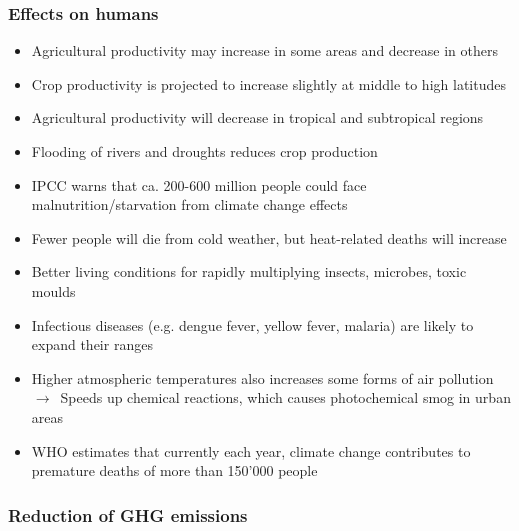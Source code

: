 \documentclass{article}
\begin{document}
\subsubsection{Effects on humans}
\vspace*{-.4cm}
\begin{itemize}
    \item Agricultural productivity may increase in some areas and decrease in others
    \item Crop productivity is projected to increase slightly at middle to high latitudes
    \item Agricultural productivity will decrease in tropical and subtropical regions
    \item Flooding of rivers and droughts reduces crop production
    \item IPCC warns that ca. 200-600 million people could face malnutrition/starvation from climate change effects
\end{itemize}

\vspace*{-.4cm}
\begin{itemize}
    \item Fewer people will die from cold weather, but heat-related deaths will increase
    \item Better living conditions for rapidly multiplying insects, microbes, toxic moulds
    \item Infectious diseases (e.g. dengue fever, yellow fever, malaria) are likely to expand their ranges
    \item Higher atmospheric temperatures also increases some forms of air pollution\\
    $\to$\ Speeds up chemical reactions, which causes photochemical smog in urban areas
    \item WHO estimates that currently each year, climate change contributes to premature deaths of more than 150'000 people
\end{itemize}

\subsubsection{Reduction of GHG emissions}
\vspace*{-.4cm}
\end{document}
